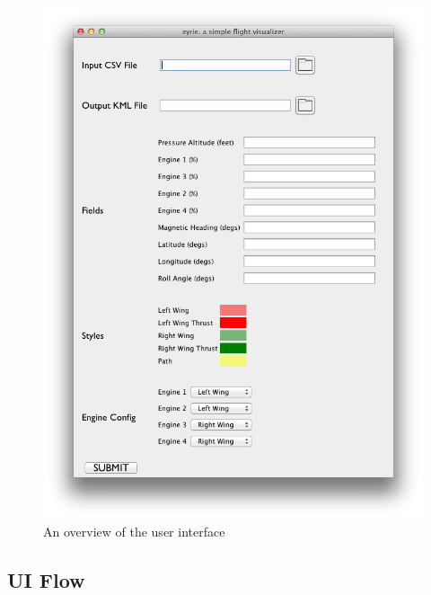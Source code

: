 \begin{figure}[h]
\centering
  \includegraphics[scale=0.5]{gfx/ui-overview.png}
\caption{An overview of the user interface}
\end{figure}

\subsection{UI Flow}

